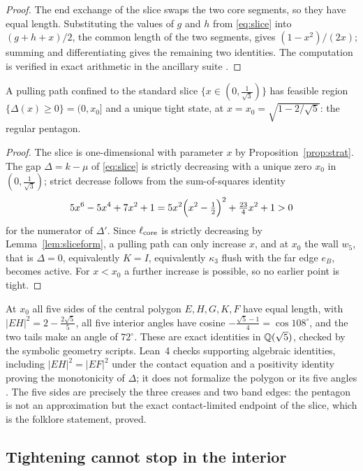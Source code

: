 \begin{proof}
The end exchange of the slice swaps the two core segments, so they have equal length. Substituting the values of $g$ and $h$ from \eqref{eq:slice} into $(g+h+x)/2$, the common length of the two segments, gives $(1-x^2)/(2x)$; summing and differentiating gives the remaining two identities. The computation is verified in exact arithmetic in the ancillary suite \cite{anc}.
\end{proof}

\begin{theorem}\label{thm:slice}
A pulling path confined to the standard slice $\{x\in(0,\tfrac1{\sqrt3})\}$ has feasible region $\{\Delta(x)\ge0\}=(0,x_0]$ and a unique tight state, at $x=x_0=\sqrt{1-2/\sqrt5}$: the regular pentagon.
\end{theorem}

\begin{proof}
The slice is one-dimensional with parameter $x$ by Proposition~\ref{prop:strat}. The gap $\Delta=k-\mu$ of \eqref{eq:slice} is strictly decreasing with a unique zero $x_0$ in $(0,\tfrac1{\sqrt3})$; strict decrease follows from the sum-of-squares identity
\[
  5x^6-5x^4+7x^2+1=5x^2\Bigl(x^2-\tfrac12\Bigr)^2+\tfrac{23}4x^2+1>0
\]
for the numerator of $\Delta'$. Since $\ell_{\mathrm{core}}$ is strictly decreasing by Lemma~\ref{lem:sliceform}, a pulling path can only increase $x$, and at $x_0$ the wall $w_5$, that is $\Delta=0$, equivalently $K=I$, equivalently $\kappa_3$ flush with the far edge $e_B$, becomes active. For $x<x_0$ a further increase is possible, so no earlier point is tight.
\end{proof}

At $x_0$ all five sides of the central polygon $E,H,G,K,F$ have equal length, with $|EH|^2=2-\tfrac{2\sqrt5}5$, all five interior angles have cosine $-\tfrac{\sqrt5-1}4=\cos108^\circ$, and the two tails make an angle of $72^\circ$. These are exact identities in $\mathbb{Q}(\sqrt5)$, checked by the symbolic geometry scripts. Lean~4 checks supporting algebraic identities, including $|EH|^2=|EF|^2$ under the contact equation and a positivity identity proving the monotonicity of $\Delta$; it does not formalize the polygon or its five angles \cite{mathlib2020,anc}. The five sides are precisely the three creases and two band edges: the pentagon is not an approximation but the exact contact-limited endpoint of the slice, which is the folklore statement, proved.

\subsection{Tightening cannot stop in the interior}

